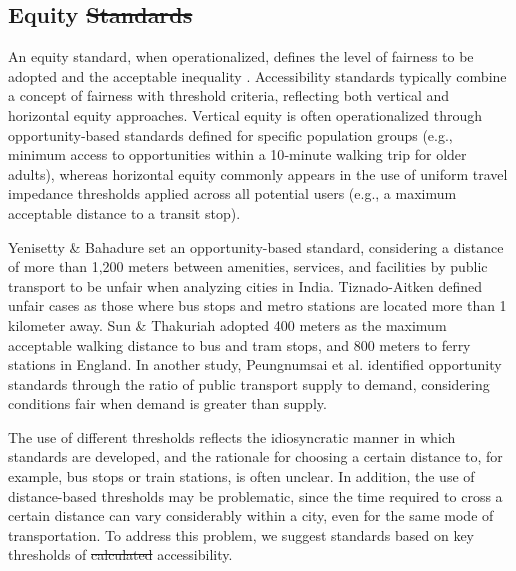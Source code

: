 \documentclass[preprint, 3p,
authoryear]{elsarticle} %
\providecommand{\DIFaddtex}[1]{{\protect\color{blue}\uwave{#1}}} %
\providecommand{\DIFdeltex}[1]{{\protect\color{red}\sout{#1}}}                      %
\providecommand{\DIFaddbegin}{} %
\providecommand{\DIFaddend}{} %
\providecommand{\DIFdelbegin}{} %
\providecommand{\DIFdelend}{} %
\providecommand{\DIFadd}[1]{\texorpdfstring{\DIFaddtex{#1}}{#1}} %
\providecommand{\DIFdel}[1]{\texorpdfstring{\DIFdeltex{#1}}{}} %
\newcommand{\DIFscaledelfig}{0.5}
\newlength{\DIFdelgraphicswidth} %
\newlength{\DIFdelgraphicsheight} %
\newcommand{\DIFaddincludegraphics}[2][]{{\color{blue}\fbox{\DIFOincludegraphics[#1]{#2}}}} %
\newcommand{\DIFdelincludegraphics}[2][]{%
\sbox{\DIFdelgraphicsbox}{\DIFOincludegraphics[#1]{#2}}%
\settoboxwidth{\DIFdelgraphicswidth}{\DIFdelgraphicsbox} %
\settoboxtotalheight{\DIFdelgraphicsheight}{\DIFdelgraphicsbox} %
\scalebox{\DIFscaledelfig}{%
\parbox[b]{\DIFdelgraphicswidth}{\usebox{\DIFdelgraphicsbox}\\[-\baselineskip] \rule{\DIFdelgraphicswidth}{0em}}\llap{\resizebox{\DIFdelgraphicswidth}{\DIFdelgraphicsheight}{%
\setlength{\unitlength}{\DIFdelgraphicswidth}%
\begin{picture}(1,1)%
\thicklines\linethickness{2pt} %
{\color[rgb]{1,0,0}\put(0,0){\framebox(1,1){}}}%
{\color[rgb]{1,0,0}\put(0,0){\line( 1,1){1}}}%
{\color[rgb]{1,0,0}\put(0,1){\line(1,-1){1}}}%
\end{picture}%
}\hspace*{3pt}}} %
} %
\DeclareRobustCommand{\DIFaddbegin}{\DIFOaddbegin \let\includegraphics\DIFaddincludegraphics} %
\DeclareRobustCommand{\DIFaddend}{\DIFOaddend \let\includegraphics\DIFOincludegraphics} %
\DeclareRobustCommand{\DIFdelbegin}{\DIFOdelbegin \let\includegraphics\DIFdelincludegraphics} %
\DeclareRobustCommand{\DIFdelend}{\DIFOaddend \let\includegraphics\DIFOincludegraphics} %
\begin{document}
\subsection{Equity \DIFdelbegin \DIFdel{Standards}\DIFdelend \DIFaddbegin \DIFadd{standards}\DIFaddend }\label{equity-standards}

An equity standard, when operationalized, defines the level of fairness
to be adopted and the acceptable inequality \citep{soukhov2025a}.
Accessibility standards typically combine a concept of fairness with
threshold criteria, reflecting both vertical and horizontal equity
approaches. Vertical equity is often operationalized through
opportunity‑based standards defined for specific population groups
(e.g., minimum access to opportunities within a 10‑minute walking trip
for older adults), whereas horizontal equity commonly appears in the use
of uniform travel impedance thresholds applied across all potential
users (e.g., a maximum acceptable distance to a transit stop).

Yenisetty \& Bahadure \citeyearpar{yenisetty2020} set an
opportunity-based standard, considering a distance of more than 1,200
meters between amenities, services, and facilities by public transport
to be unfair when analyzing cities in India. Tiznado-Aitken
\citeyearpar{tiznado-aitken2018} defined unfair cases as those where bus
stops and metro stations are located more than 1 kilometer away. Sun \&
Thakuriah \citeyearpar{sun2021} adopted 400 meters as the maximum
acceptable walking distance to bus and tram stops, and 800 meters to
ferry stations in England. In another study, Peungnumsai et al.
\citep{peungnumsai2020} identified opportunity standards through the
ratio of public transport supply to demand, considering conditions fair
when demand is greater than supply.

The use of different thresholds reflects the idiosyncratic manner in
which standards are developed, and the rationale for choosing a certain
distance to, for example, bus stops or train stations, is often unclear.
In addition, the use of distance-based thresholds may be problematic,
since the time required to cross a certain distance can vary
considerably within a city, even for the same mode of transportation. To
address this problem, we suggest standards based on key thresholds of
\DIFdelbegin \DIFdel{calculated }\DIFdelend \DIFaddbegin \DIFadd{objective }\DIFaddend accessibility.
\end{document}
